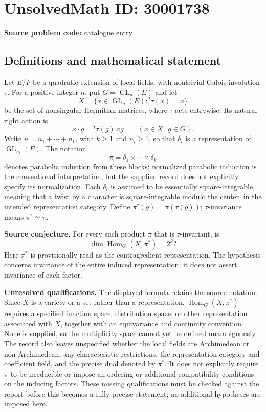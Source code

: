 \documentclass[11pt]{article}
\begin{document}
\section*{UnsolvedMath ID: 30001738}
\textbf{Source problem code:} catalogue entry
\subsection{Definitions and mathematical statement}
Let \(E/F\) be a quadratic extension of local fields, with nontrivial Galois involution \(\tau\). For a positive integer \(n\), put \(G=\operatorname{GL}_n(E)\) and let
\[
X=\{x\in\operatorname{GL}_n(E):{}^t\tau(x)=x\}
\]
be the set of nonsingular Hermitian matrices, where \(\tau\) acts entrywise. Its natural right action is
\[
x\cdot g={}^t\tau(g)\,xg\qquad(x\in X,\ g\in G).
\]
Write \(n=n_1+\cdots+n_k\), with \(k\geq1\) and \(n_i\geq1\), so that \(\delta_i\) is a representation of \(\operatorname{GL}_{n_i}(E)\). The notation
\[
\pi=\delta_1\times\cdots\times\delta_k
\]
denotes parabolic induction from these blocks; normalized parabolic induction is the conventional interpretation, but the supplied record does not explicitly specify its normalization. Each \(\delta_i\) is assumed to be essentially square-integrable, meaning that a twist by a character is square-integrable modulo the center, in the intended representation category. Define \(\pi^\tau(g)=\pi(\tau(g))\); \(\tau\)-invariance means \(\pi^\tau\simeq\pi\).

\textbf{Source conjecture.} For every such product \(\pi\) that is \(\tau\)-invariant, is
\[
\dim\operatorname{Hom}_G(X,\pi^*)=2^k?
\]
Here \(\pi^*\) is provisionally read as the contragredient representation. The hypothesis concerns invariance of the entire induced representation; it does not assert invariance of each factor.

\textbf{Unresolved qualifications.} The displayed formula retains the source notation. Since \(X\) is a variety or a set rather than a representation, \(\operatorname{Hom}_G(X,\pi^*)\) requires a specified function space, distribution space, or other representation associated with \(X\), together with an equivariance and continuity convention. None is supplied, so the multiplicity space cannot yet be defined unambiguously. The record also leaves unspecified whether the local fields are Archimedean or non-Archimedean, any characteristic restrictions, the representation category and coefficient field, and the precise dual denoted by \(\pi^*\). It does not explicitly require \(\pi\) to be irreducible or impose an ordering or additional compatibility conditions on the inducing factors. These missing qualifications must be checked against the report before this becomes a fully precise statement; no additional hypotheses are imposed here.
\end{document}
